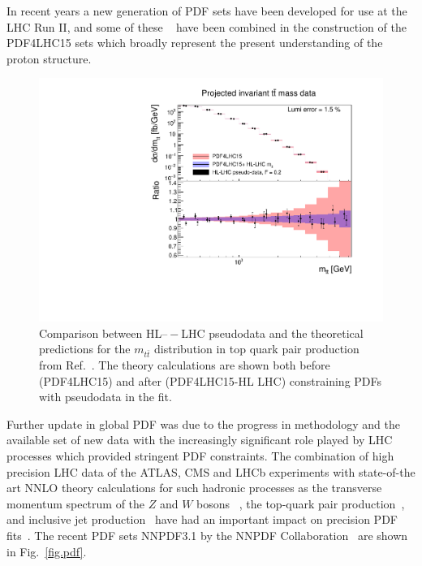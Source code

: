 In recent years a new generation of PDF sets  have been developed for use at the LHC Run II, and some of  these ~\cite{Ball:2014uwa,Dulat:2015mca,Harland-Lang:2014zoa} have been combined  in the construction of the PDF4LHC15  sets which  broadly represent the present understanding of the proton structure.
\begin{figure}[t]
\begin{center}
  \includegraphics[scale=0.5]{Strong-Interaction/mtt_output_F_0_2_data.pdf}
  \caption{\small
Comparison between  HL$–-$LHC pseudodata and the theoretical predictions for
the $m_{t\bar t}$ distribution in top quark pair production   from Ref.~\cite{Khalek:2018mdn}. The theory calculations are shown both before (PDF4LHC15) and after  (PDF4LHC15-HL LHC) constraining PDFs  with  pseudodata  in the fit.}
\label{fig.hllhc}
\end{center}
\end{figure}
Further  update  in global PDF
was  due to the progress  in  methodology  and  the available  set of new  data with
 the increasingly significant role played by LHC processes which provided stringent PDF constraints. The combination of high precision LHC data of the ATLAS, CMS and LHCb experiments   with state-of-the art NNLO theory calculations for such hadronic processes as  the transverse momentum spectrum of the $Z$ and $W$ bosons ~\cite{Boughezal:2015dva,Ridder:2015dxa}, the top-quark pair production~\cite{Czakon:2015owf,Czakon:2016dgf},  and inclusive jet production~\cite{Currie:2013dwa,Currie:2016bfm} have had  an important impact on precision PDF fits~\cite{Ball:2017nwa}. The  recent  PDF sets  NNPDF3.1 by the NNPDF Collaboration~\cite{Ball:2017nwa} are shown in   Fig.~\ref{fig.pdf}.

